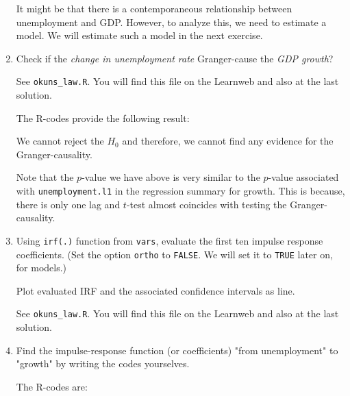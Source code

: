 \begin{enumerate}
\begin{sol}
              It might be that there is a contemporaneous relationship between unemployment and GDP. However, to analyze this, we need to estimate a \svarp{} model. We will estimate such a model in the next exercise.
          \end{sol}

    \item Check if the \emph{change in unemployment rate} Granger-cause the \emph{GDP growth}?

          \begin{sol}
              See \texttt{okuns\_law.R}. You will find this file on the Learnweb and also at the last solution.

              The R-codes provide the following result: \texttt{}

              We cannot reject the $H_0$ and therefore, we cannot find any evidence for the Granger-causality.

              Note that the $p$-value we have above is very similar to the $p$-value associated with \texttt{unemployment.l1} in the regression summary for growth. This is because, there is only one lag and $t$-test almost coincides with testing the Granger-causality.
          \end{sol}

    \item Using \verb|irf(.)| function from \verb|vars|, evaluate the first ten impulse response coefficients. (Set the option \verb|ortho| to \texttt{FALSE}. We will set it to \texttt{TRUE} later on, for \svarp{} models.)

          Plot evaluated IRF and the associated confidence intervals as line.

          \begin{sol}
              See \texttt{okuns\_law.R}. You will find this file on the Learnweb and also at the last solution.
          \end{sol}

    \item Find the impulse-response function (or coefficients) "from unemployment" to "growth" by writing the codes yourselves.

          \begin{sol}
              The R-codes are:
          \end{sol}
\end{enumerate}
